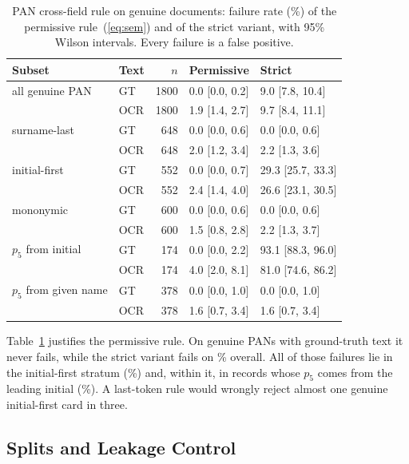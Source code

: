 \documentclass[conference]{IEEEtran}
\begin{document}
\begin{table}[!t]
\caption{PAN cross-field rule on genuine documents: failure rate (\%)
of the permissive rule~(\ref{eq:sem}) and of the strict variant, with
95\% Wilson intervals. Every failure is a false positive.}
\label{tab:permstrict}
\centering
\scriptsize
\setlength{\tabcolsep}{3.5pt}
\renewcommand{\arraystretch}{1.05}
\begin{tabular}{@{}llrll@{}}
\toprule
Subset & Text & $n$ & Permissive & Strict \\
\midrule
all genuine PAN & GT & 1800 & 0.0 [0.0, 0.2] & 9.0 [7.8, 10.4] \\
 & OCR & 1800 & 1.9 [1.4, 2.7] & 9.7 [8.4, 11.1] \\
\addlinespace[1.5pt]
surname-last & GT & 648 & 0.0 [0.0, 0.6] & 0.0 [0.0, 0.6] \\
 & OCR & 648 & 2.0 [1.2, 3.4] & 2.2 [1.3, 3.6] \\
\addlinespace[1.5pt]
initial-first & GT & 552 & 0.0 [0.0, 0.7] & 29.3 [25.7, 33.3] \\
 & OCR & 552 & 2.4 [1.4, 4.0] & 26.6 [23.1, 30.5] \\
\addlinespace[1.5pt]
mononymic & GT & 600 & 0.0 [0.0, 0.6] & 0.0 [0.0, 0.6] \\
 & OCR & 600 & 1.5 [0.8, 2.8] & 2.2 [1.3, 3.7] \\
\addlinespace[1.5pt]
$p_5$ from initial & GT & 174 & 0.0 [0.0, 2.2] & 93.1 [88.3, 96.0] \\
 & OCR & 174 & 4.0 [2.0, 8.1] & 81.0 [74.6, 86.2] \\
\addlinespace[1.5pt]
$p_5$ from given name & GT & 378 & 0.0 [0.0, 1.0] & 0.0 [0.0, 1.0] \\
 & OCR & 378 & 1.6 [0.7, 3.4] & 1.6 [0.7, 3.4] \\
\bottomrule
\end{tabular}
\end{table}

Table~\ref{tab:permstrict} justifies the permissive rule. On genuine
PANs with ground-truth text it never fails, while the strict variant
fails on \dsStrictAll\% overall. All of those failures lie in the
initial-first stratum (\dsStrictInitialFirst\%) and, within it, in
records whose $p_5$ comes from the leading initial
(\dsStrictLeadingInitial\%). A last-token rule would wrongly reject
almost one genuine initial-first card in three.

\subsection{Splits and Leakage Control}
\label{subsec:leakage}
\label{subsec:probe}
\end{document}
